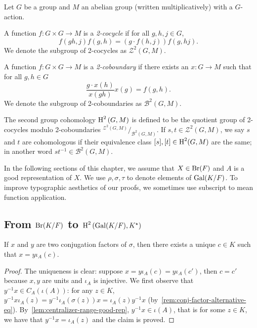 \begin{definition}
  \label{def:second-group-coh}
  Let $G$ be a group and $M$ an abelian group (written multiplicatively) with a $G$-action.

  A function $f : G \times G \to M$ is a {\em 2-cocycle\/} if for all $g,h,j\in G$,
  \[
    f(gh, j)f(g, h) = \left(g\cdot f(h, j)\right) f(g, hj).
  \]
  We denote the subgroup of 2-cocycles as $\mathcal{Z}^{2}(G, M)$.

  A function $f : G\times G \to M$ is a {\em 2-coboundary\/} if there exists an $x : G \to M$ such that for all $g, h \in G$
  \[
    \frac{g\cdot x(h)}{x(gh)} x(g) = f(g, h).
  \]
  We denote the subgroup of 2-coboundaries as $\mathcal{B}^{2}(G, M)$.

  The second group cohomology $\operatorname{H}^{2}\left(G, M\right)$ is defined to be the quotient group of 2-cocycles modulo 2-coboundaries $^{\mathcal{Z}^{2}(G, M)}/_{\mathcal{B}^{2}(G, M)}$. If $s, t \in \mathcal{Z}^{2}(G, M)$, we say $s$ and $t$ are cohomologous if their equivalence class $[s], [t] \in \operatorname{H}^{2}(G, M)$ are the same; in another word $st^{-1}\in\mathcal{B}^{2}(G, M)$.
  \leanok
\end{definition}

In the following sections of this chapter, we assume that $X \in\operatorname{Br}(F)$ and $A$ is a good representation of $X$. We use $\rho, \sigma, \tau$ to denote elements of $\operatorname{Gal}(K/F)$. To improve typographic aesthetics of our proofs, we sometimes use subscript to mean function application.


\subsection{From $\operatorname{Br}(K/F)$ to $\operatorname{H}^{2}\left(\operatorname{Gal}(K/F),K^{\star}\right)$}

\begin{lemma}\label{lem:twist-spec1}
  If $x$ and $y$ are two conjugation factors of $\sigma$, then there exists a unique $c \in K$ such that $x = y\iota_{A}(c)$.
  \leanok
\end{lemma}

\begin{proof}
  The uniqueness is clear: suppose $x = y\iota_{A}(c)=y\iota_{A}(c')$, then $c = c'$ because $x, y$ are units and $\iota_{A}$ is injective. We first observe that $y^{-1}x\in C_{A}(\iota(A))$: for any $z \in K$, $y^{-1}x\iota_{A}(z)=y^{-1}\iota_{A}(\sigma(z))x=\iota_{A}(z)y^{-1}x$ (by~\cref{rem:conj-factor-alternative-eq}). By~\cref{lem:centralizer-range-good-rep}, $y^{-1}x\in \iota(A)$, that is for some $z \in K$, we have that $y^{-1}x = \iota_{A}(z)$ and the claim is proved.
\end{proof}

